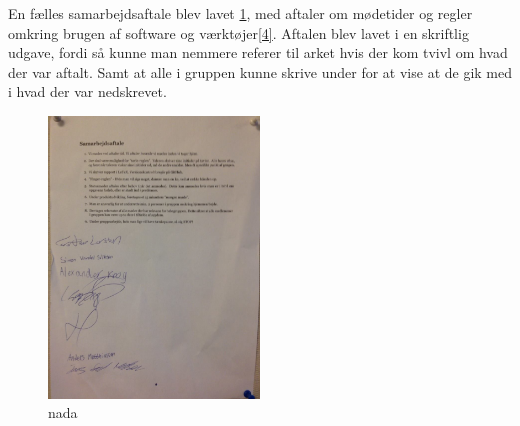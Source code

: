 En fælles samarbejdsaftale blev lavet \ref{SAftale}, med aftaler om mødetider og regler omkring brugen af software og værktøjer\ref{4}. Aftalen blev lavet i en skriftlig udgave, fordi så kunne man nemmere referer til arket hvis der kom tvivl om hvad der var aftalt. Samt at alle i gruppen kunne skrive under for at vise at de gik med i hvad der var nedskrevet.

\begin{figure}[ht!]
  \centering
  \includegraphics[width=0.5\textwidth]{Images/S_Aftale.jpg}
  \caption{nada}
  \label{SAftale}
\end{figure}


